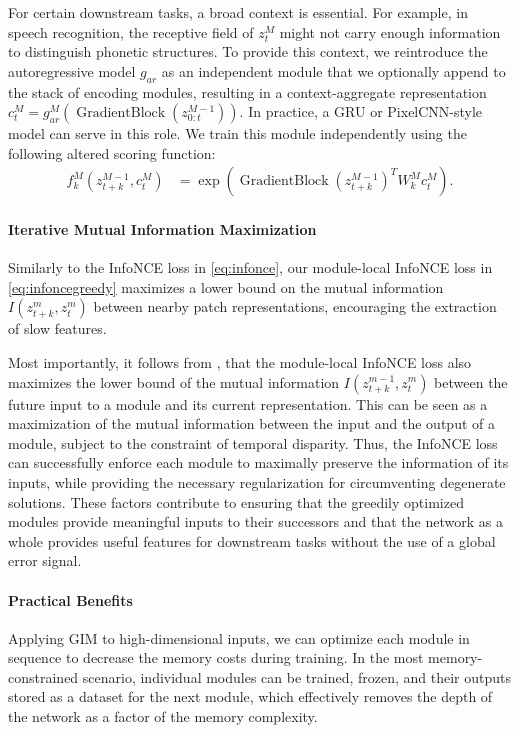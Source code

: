 \documentclass{article}
\newcommand{\ztk}{z_{t+k}}
\newcommand{\ct}{c_{t}}
\newcommand{\zt}{z_{t}}
\newcommand{\Wk}{W_{k}}
\DeclareMathOperator{\gradblock}{GradientBlock}
\begin{document}
For certain downstream tasks, a broad context is essential. For example, in speech recognition, the receptive field of $z_t^M$ might not carry enough information to distinguish phonetic structures. To provide this context, we reintroduce the autoregressive model $g_{ar}$ as an independent module that we optionally append to the stack of encoding modules, resulting in a context-aggregate representation $\ct^M = g_{ar}^M\left(\gradblock\left(z^{M-1}_{0:t}\right)\right)$. In practice, a GRU or PixelCNN-style model can serve in this role. We train this module independently using the following altered scoring function:
\begin{align}
f_k^M(\ztk^{M-1}, \ct^{M}) &= \exp \left(\gradblock\left({\ztk^{M-1}}\right)^T \Wk^M \ct^{M}\right).
\end{align}

\paragraph{Iterative Mutual Information Maximization}

Similarly to the InfoNCE loss in \cref{eq:infonce}, our module-local InfoNCE loss in \cref{eq:infoncegreedy} maximizes a lower bound on the mutual information $I(\ztk^m, \zt^m)$ between nearby patch representations, encouraging the extraction of slow features. 


Most importantly, it follows from \citet{oord2018representation}, that the module-local InfoNCE loss also maximizes the lower bound of the mutual information $I(\ztk^{m-1}, \zt^m)$ between the future input to a module and its current representation. This can be seen as a maximization of the mutual information between the input and the output of a module, subject to the constraint of temporal disparity. Thus, the InfoNCE loss can successfully enforce each module to maximally preserve the information of its inputs, while providing the necessary regularization \citep{krause2010discriminative,hu2017learning} for circumventing degenerate solutions. These factors contribute to ensuring that the greedily optimized modules provide meaningful inputs to their successors and that the network as a whole provides useful features for downstream tasks without the use of a global error signal. 

\paragraph{Practical Benefits}
Applying GIM to high-dimensional inputs, we can optimize each module in sequence to decrease the memory costs during training. In the most memory-constrained scenario, individual modules can be trained, frozen, and their outputs stored as a dataset for the next module, which effectively removes the depth of the network as a factor of the memory complexity.
\end{document}
